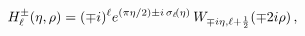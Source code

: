 \[\mathop{{H^{\pm}_{\ell}}\/}\nolimits\!\left(\eta,\rho\right)=(\mp i)^{\ell}e^{%
(\pi\eta/2)\pm i\mathop{{\sigma_{\ell}}\/}\nolimits\!\left(\eta\right)}\mathop%
{W_{\mp i\eta,\ell+\frac{1}{2}}\/}\nolimits\!\left(\mp 2i\rho\right),\]